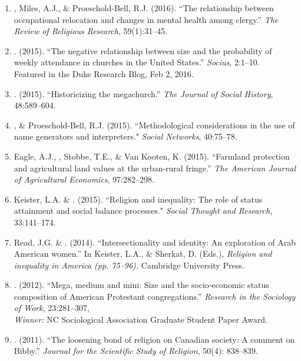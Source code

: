 \begin{enumerate}
\item \Eagle, Miles, A.J., \& Proeschold-Bell, R.J. (2016). ``The relationship between occupational relocation and changes in mental health among clergy.'' \emph{The Review of Religious Research}, 59(1):31--45. 

\item \Eagle. (2015). ``The negative relationship between size and the probability of weekly attendance in churches in the United States.'' \emph{Socius}, 2:1--10.  \\
Featured in the Duke Research Blog, Feb 2, 2016.

\item \Eagle. (2015). ``Historicizing the megachurch.'' \textit{The Journal of Social History}, 48:589--604. 

\item \Eagle, \& Proeschold-Bell, R.J. (2015). ``Methodological considerations in the use of name generators and interpreters." \emph{Social Networks}, 40:75--78. 

\item Eagle, A.J., \Eagle, Stobbe, T.E., \& Van Kooten, K. (2015). ``Farmland protection and agricultural land values at the urban-rural fringe.'' \emph{The American Journal of Agricultural Economics}, 97:282--298. 

\item Keister, L.A. \& \Eagle. (2015). ``Religion and inequality: The role of status attainment and social balance processes." \emph{Social Thought and Research}, 33:141--174.

\item Read, J.G. \& \Eagle. (2014). ``Intersectionality and identity: An exploration of Arab American women.'' In Keister, L.A., \& Sherkat, D. (Eds.), \emph{Religion and inequality in America (pp. 75--96).} Cambridge University Press.

\item \Eagle. (2012). ``Mega, medium and mini: Size and the socio-economic status composition of American Protestant congregations.'' \emph{Research in the Sociology of Work}, 23:281--307, \\ \emph{Winner:} NC Sociological Association Graduate Student Paper Award.

\item \Eagle. (2011). ``The loosening bond of religion on Canadian society: A comment on Bibby.'' \emph{Journal for the Scientific Study of Religion}, 50(4): 838--839.


\end{enumerate}
